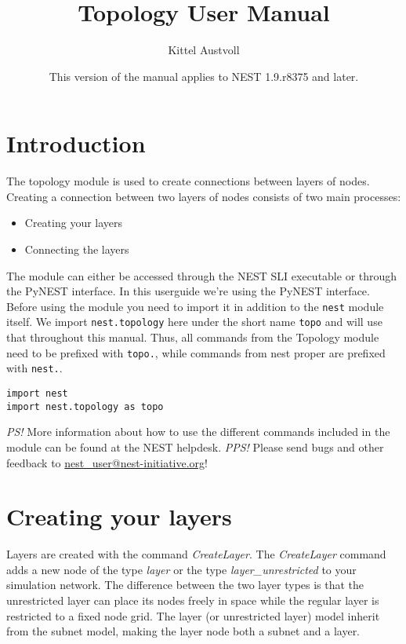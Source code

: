 \documentclass{article}
\title{Topology User Manual}
\author{Kittel Austvoll}
\date{This version of the manual applies to NEST 1.9.r8375 and later.}
\begin{document}
\maketitle 

\tableofcontents

\section{Introduction}

The topology module is used to create connections between layers of nodes. Creating a connection between two layers of nodes consists of two main processes:

\begin{itemize}
\item Creating your layers
\item Connecting the layers
\end{itemize}


\noindent The module can either be accessed through the NEST SLI
executable or through the PyNEST interface. In this userguide we're
using the PyNEST interface. Before using the module you need to import
it in addition to the \verb#nest# module itself. We import
\verb#nest.topology# here under the short name \verb#topo# and will use
that throughout this manual. Thus, all commands from the Topology
module need to be prefixed with \verb#topo.#, while commands from nest
proper are prefixed with \verb#nest.#.

\begin{verbatim}
import nest
import nest.topology as topo
\end{verbatim}

\noindent \emph{PS!} More information about how to use the different commands included in the module can be found at the NEST helpdesk.
\newline \emph{PPS!} Please send bugs and other feedback to \url{nest_user@nest-initiative.org}!

\section{Creating your layers}

Layers are created with the command \emph{CreateLayer}. The \emph{CreateLayer} command adds a new node of the type \emph{layer} or the type \emph{layer\_unrestricted} to your simulation network. The difference between the two layer types is that the unrestricted layer can place its nodes freely in space while the regular layer is restricted to a fixed node grid. The layer (or unrestricted layer) model inherit from the subnet model, making the layer node both a subnet and a layer.
\end{document}
